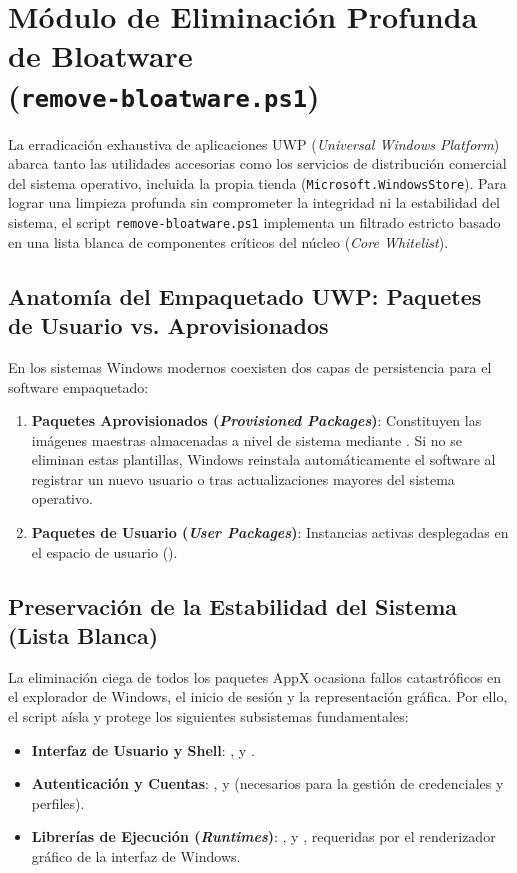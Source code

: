 \documentclass[12pt,a4paper]{report}
\begin{document}
\section[Módulo de Eliminación Profunda de Bloatware]{Módulo de Eliminación Profunda de Bloatware\\ \large(\texttt{remove-bloatware.ps1})}
La erradicación exhaustiva de aplicaciones UWP (\textit{Universal Windows Platform}) abarca tanto las utilidades accesorias como los servicios de distribución comercial del sistema operativo, incluida la propia tienda (\texttt{Microsoft.WindowsStore}). Para lograr una limpieza profunda sin comprometer la integridad ni la estabilidad del sistema, el script \texttt{remove-bloatware.ps1} implementa un filtrado estricto basado en una lista blanca de componentes críticos del núcleo (\textit{Core Whitelist}).

\subsection{Anatomía del Empaquetado UWP: Paquetes de Usuario vs. Aprovisionados}
En los sistemas Windows modernos coexisten dos capas de persistencia para el software empaquetado:
\begin{enumerate}
    \item \textbf{Paquetes Aprovisionados (\textit{Provisioned Packages})}: Constituyen las imágenes maestras almacenadas a nivel de sistema mediante . Si no se eliminan estas plantillas, Windows reinstala automáticamente el software al registrar un nuevo usuario o tras actualizaciones mayores del sistema operativo.
    \item \textbf{Paquetes de Usuario (\textit{User Packages})}: Instancias activas desplegadas en el espacio de usuario ().
\end{enumerate}

\subsection{Preservación de la Estabilidad del Sistema (Lista Blanca)}
La eliminación ciega de todos los paquetes AppX ocasiona fallos catastróficos en el explorador de Windows, el inicio de sesión y la representación gráfica. Por ello, el script aísla y protege los siguientes subsistemas fundamentales:
\begin{itemize}
    \item \textbf{Interfaz de Usuario y Shell}: ,  y .
    \item \textbf{Autenticación y Cuentas}: ,  y  (necesarios para la gestión de credenciales y perfiles).
    \item \textbf{Librerías de Ejecución (\textit{Runtimes})}: ,  y , requeridas por el renderizador gráfico de la interfaz de Windows.
\end{itemize}
\end{document}
